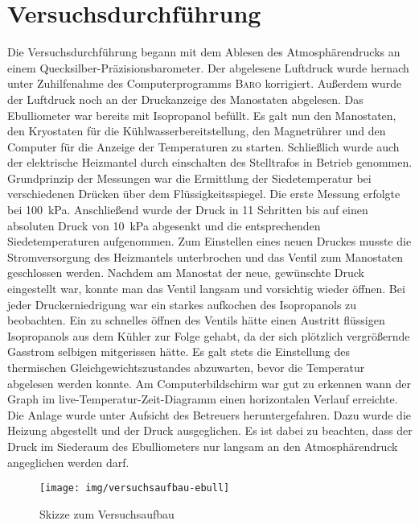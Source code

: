 \section{Versuchsdurchführung}
\label{sec:durchfuerung}

Die Versuchsdurchführung begann mit dem Ablesen des Atmosphärendrucks an einem Quecksilber-Präzisionsbarometer. Der abgelesene Luftdruck wurde hernach unter Zuhilfenahme des Computerprogramms \textsc{Baro} korrigiert. Außerdem wurde der Luftdruck noch an der Druckanzeige des Manostaten abgelesen.
Das Ebulliometer war bereits mit Isopropanol befüllt. Es galt nun den Manostaten, den Kryostaten für die Kühlwasserbereitstellung, den Magnetrührer und den Computer für die Anzeige der Temperaturen zu starten. Schließlich wurde auch der elektrische Heizmantel durch einschalten des Stelltrafos in Betrieb genommen.
Grundprinzip der Messungen war die Ermittlung der Siedetemperatur bei verschiedenen Drücken über dem Flüssigkeitsspiegel. Die erste Messung erfolgte bei \SI{100}{\kilo\pascal}. Anschließend wurde der Druck in 11 Schritten bis auf einen absoluten Druck von \SI{10}{\kilo\pascal} abgesenkt und die entsprechenden Siedetemperaturen aufgenommen. Zum Einstellen eines neuen Druckes musste die Stromversorgung des Heizmantels unterbrochen und das Ventil zum Manostaten geschlossen werden. Nachdem am Manostat der neue, gewünschte Druck eingestellt war, konnte man das Ventil langsam und vorsichtig wieder öffnen. Bei jeder Druckerniedrigung war ein starkes aufkochen des Isopropanols zu beobachten. Ein zu schnelles öffnen des Ventils hätte einen Austritt flüssigen Isopropanols aus dem Kühler zur Folge gehabt, da der sich plötzlich vergrößernde Gasstrom selbigen mitgerissen hätte. Es galt stets die Einstellung des thermischen Gleichgewichtszustandes abzuwarten, bevor die Temperatur abgelesen werden konnte. Am Computerbildschirm war gut zu erkennen wann der Graph im live-Temperatur-Zeit-Diagramm einen horizontalen Verlauf erreichte. 
Die Anlage wurde unter Aufsicht des Betreuers heruntergefahren. Dazu wurde die Heizung abgestellt und der Druck ausgeglichen. Es ist dabei zu beachten, dass der Druck im Siederaum des Ebulliometers nur langsam an den Atmosphärendruck angeglichen werden darf.
\begin{figure}[h!]
\centering
\texttt{[image: img/versuchsaufbau-ebull]}
\caption{Skizze zum Versuchsaufbau}
\label{fig:versuchsaufbau-ebull}
\end{figure}
